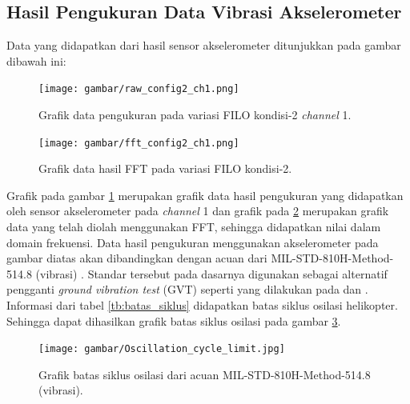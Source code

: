 \subsection{Hasil Pengukuran Data Vibrasi Akselerometer}

Data yang didapatkan dari hasil sensor akselerometer ditunjukkan pada gambar dibawah ini:

\begin{figure}[h]
	\centering
	\texttt{[image: gambar/raw\_config2\_ch1.png]}
	\caption{Grafik data pengukuran pada variasi FILO kondisi-2 \textit{channel} 1.}
	\label{fig:raw_config2_FILO}
\end{figure}

\begin{figure}[H]
	\centering
	\texttt{[image: gambar/fft\_config2\_ch1.png]}
	\caption{Grafik data hasil FFT pada variasi FILO kondisi-2.}
	\label{fig:fft_config2_FILO}
\end{figure}

Grafik pada gambar \ref{fig:raw_config2_FILO} merupakan grafik data hasil pengukuran yang didapatkan oleh sensor akselerometer pada \textit{channel} 1 dan grafik pada \ref{fig:fft_config2_FILO} merupakan grafik data yang telah diolah menggunakan FFT, sehingga didapatkan nilai dalam domain frekuensi. Data hasil pengukuran menggunakan akselerometer pada gambar diatas akan dibandingkan dengan acuan dari MIL-STD-810H-Method-514.8 (vibrasi) \cite{MILSTD}. Standar tersebut pada dasarnya digunakan sebagai alternatif pengganti \textit{ground vibration test} (GVT) seperti yang dilakukan pada \cite{lubrina:hal-01059708} dan \cite{Ciavarella2018AnEH}. Informasi dari tabel \ref{tb:batas_siklus} didapatkan batas siklus osilasi helikopter. Sehingga dapat dihasilkan grafik batas siklus osilasi pada gambar \ref{fig:batas_siklus}. 

\begin{figure}[h]
	\centering
	\texttt{[image: gambar/Oscillation\_cycle\_limit.jpg]}
	\caption{Grafik batas siklus osilasi dari acuan MIL-STD-810H-Method-514.8 (vibrasi).}
	\label{fig:batas_siklus}
\end{figure}

